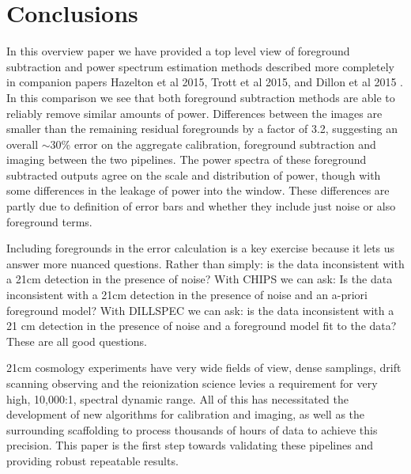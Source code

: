 \documentclass[twolcolumn,iop]{emulateapj}
\def\empirical{DILLSPEC}
\def\chipscite{Trott et al 2015}
\def\eppsiloncite{Hazelton et al 2015}
\def\dilloncite{Dillon et al 2015 }
\begin{document}
\section{Conclusions}
\label{sec:conclusion}
In this overview paper we have provided a top level view of foreground subtraction and power spectrum estimation methods described more completely in companion papers \eppsiloncite{}, \chipscite{}, and \dilloncite{}.  In this comparison we see that both foreground subtraction methods are able to reliably remove similar amounts of power.  Differences between the images are smaller than the remaining residual foregrounds by a factor of 3.2, suggesting an overall $\sim$30\% error on the aggregate calibration, foreground subtraction and imaging between the two pipelines.  The power spectra of these foreground subtracted outputs agree on the scale and distribution of power, though with some differences in the leakage of power into the window. These differences are partly due to definition of error bars and whether they include just noise or also foreground terms.  

Including foregrounds in the error calculation is a key exercise because it lets us answer more nuanced questions. Rather than simply: is the data inconsistent with a 21cm detection in the presence of noise? With CHIPS we can ask: Is the data inconsistent with a 21cm detection in the presence of noise and an a-priori foreground model? With \empirical{} we can ask: is the data inconsistent with a 21 cm detection in the presence of noise and a foreground model fit to the data? These are all good questions.

21cm cosmology experiments have very wide fields of view, dense samplings, drift scanning observing and the reionization science levies a requirement for very high, 10,000:1, spectral dynamic range. All of this has necessitated the development of new algorithms for calibration and imaging, as well as the surrounding scaffolding to process thousands of hours of data to achieve this precision.  This paper is the first step towards validating these pipelines and providing robust repeatable results.


\end{document}
